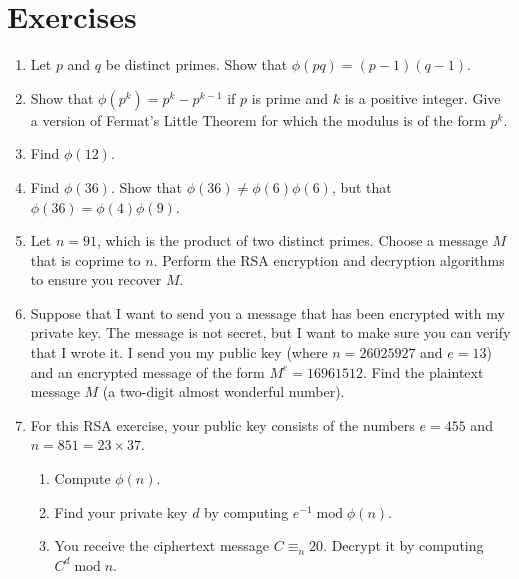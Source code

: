 \documentclass{book}
\theoremstyle{plain}
\theoremstyle{definition}
\newif\ifprintsolutions
\newcommand{\solution}[1]{\ifprintsolutions \begin{sloppypar}{\it #1}\end{sloppypar} \fi} %
\renewcommand{\mod}{\operatorname{mod}}
\renewcommand{\mod}{\operatorname{mod}}
\begin{document}
\section{Exercises}
\begin{enumerate}
\item Let $p$ and $q$ be distinct primes. Show that $\phi(pq) = (p-1)(q-1)$. \solution{Since $p$ and $q$ are coprime, we have $\phi(pq) = \phi(p)\phi(q) = (p-1)(q-1)$.}
\item Show that $\phi(p^k) = p^k - p^{k-1}$ if $p$ is prime and $k$ is a positive integer. Give a version of Fermat's Little Theorem for which the modulus is of the form $p^k$. \solution{The only integers not coprime are multiples of $p$. One version of the Little Theorem states that if $\gcd(a,p^k) = 1$, then $a^{p^k} \equiv a^{p^{k-1}} \mod n$.}
\item Find $\phi(12)$. \solution{The coprime integers are those in the set $\{1,5,7,11\}$, so $\phi(12) = 4$.}
\item Find $\phi(36)$. Show that $\phi(36) \neq \phi(6)\phi(6)$, but that $\phi(36) = \phi(4)\phi(9)$. \solution{$\phi(36) = 12 = 2 \times 6 = \phi(4)\phi(9)$, but $\phi(6) = 2$}
\item Let $n = 91$, which is the product of two distinct primes. Choose a message $M$ that is coprime to $n$. Perform the RSA encryption and decryption algorithms to ensure you recover $M$. \solution{The factorization is $91 = 7 \times 13$.}
\item Suppose that I want to send you a message that has been encrypted with my private key. The message is not secret, but I want to make sure you can verify that I wrote it. I send you my public key (where $n = 26025927$ and $e = 13$) and an encrypted message of the form $M^e = 16961512$. Find the plaintext message $M$ (a two-digit almost wonderful number). \solution{$M = 16961512^{13} \mod 26025927 \equiv 43 \mod 26025927$}
\item For this RSA exercise, your public key consists of the numbers $e = 455$ and $n = 851 = 23 \times 37$.
\begin{enumerate}
\item Compute $\phi(n)$. \solution{$\phi(n) = \phi(851) = \phi(23)\phi(37) = 22 \times 36 = 792$}
\item Find your private key $d$ by computing $e^{-1} \mod \phi(n)$. \solution{$d \equiv_{\phi(n)} e^{-1} \equiv_{792} 47$}
\item You receive the ciphertext message $C \equiv_n 20$. Decrypt it by computing $C^d \mod n$. \solution{$C^d \equiv_n 20^{47} \equiv_{851} 42$}

\end{enumerate}
\end{enumerate}
\end{document}
